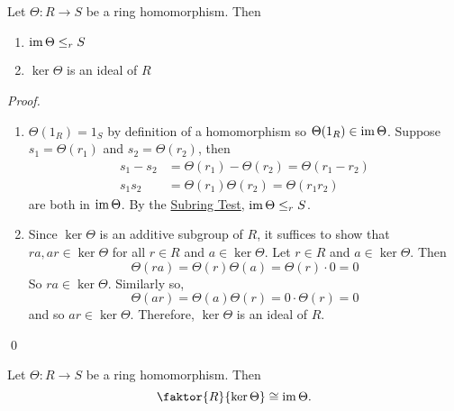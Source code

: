 \begin{propo}
\label{propo:image_of_hm_is_a_subring_n_kernel_of_hm_is_a_normal_subring}
  Let $\Theta: R \to S$ be a ring homomorphism. Then
  \begin{enumerate}
    \item $\operatorname{im} \Theta \leq_r S$
    \item $\ker \Theta$ is an ideal of $R$
  \end{enumerate}
\end{propo}

\begin{proof}
  \begin{enumerate}
    \item $\Theta(1_R) = 1_S$ by definition of a homomorphism so $\Theta(1_R) \in \operatorname{im} \Theta$. Suppose $s_1 = \Theta(r_1)$ and $s_2 = \Theta(r_2)$, then
      \begin{align*}
        s_1 - s_2 &= \Theta(r_1) - \Theta(r_2) = \Theta(r_1 - r_2) \\
        s_1 s_2 &= \Theta(r_1) \Theta(r_2) = \Theta(r_1 r_2)
      \end{align*}
      are both in $\operatorname{im} \Theta$. By the \hyperref[spe:subring_test]{Subring Test}, $\operatorname{im} \Theta \leq_r S$.

    \item Since $\ker \Theta$ is an additive subgroup of $R$, it suffices to show that $ra, ar \in \ker \Theta$ for all $r \in R$ and $a \in \ker \Theta$. Let $r \in R$ and $a \in \ker \Theta$. Then
      \begin{equation*}
        \Theta(ra) = \Theta(r) \Theta(a) = \Theta(r) \cdot 0 = 0
      \end{equation*}
      So $ra \in \ker \Theta$. Similarly so,
      \begin{equation*}
        \Theta(ar) = \Theta(a) \Theta(r) = 0 \cdot \Theta(r) = 0
      \end{equation*}
      and so $ar \in \ker \Theta$. Therefore, $\ker \Theta$ is an ideal of $R$.
  \end{enumerate}\qed
\end{proof}

\begin{thm}
\label{thm:first_isomorphism_theorem_for_rings}
  Let $\Theta : R \to S$ be a ring homomorphism. Then
  \begin{equation*}
    \faktor{R}{\ker \Theta} \cong \img \Theta.
  \end{equation*}
\end{thm}

